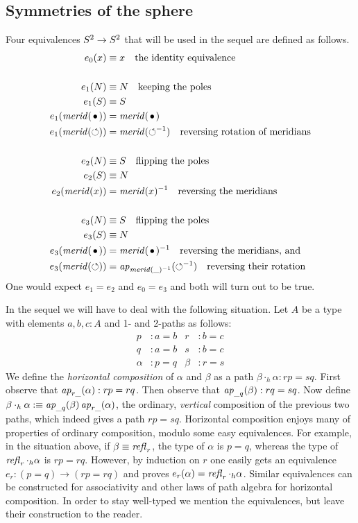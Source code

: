 \documentclass[english,a4]{article}
\begin{document}
\subsection{Symmetries of the sphere}
\label{sec:symmetries-sphere}

Four equivalences $S^2\to S^2$ that will be used in the sequel are
defined as follows. 
\begin{align}
  \label{eq:S2symmetries}
  e_0(x)&\jdeq x \quad\text{the identity equivalence}\\
\nonumber\\
  e_1(N)&\jdeq N \quad\text{keeping the poles}\\
  e_1(S)&\jdeq S\\
  e_1(\mrd(\base))&= \mrd(\base)\\
  e_1(\mrd(\Sloop))&= \mrd(\Sloop^{-1})\quad\text{reversing rotation of meridians}\\
\nonumber\\
  e_2(N)&\jdeq S \quad\text{flipping the poles}\\
  e_2(S)&\jdeq N\\
  e_2(\mrd(x))&= \mrd(x)^{-1}\quad\text{reversing the meridians}\\
\nonumber\\
  e_3(N)&\jdeq S \quad\text{flipping the poles}\\
  e_3(S)&\jdeq N\\
  e_3(\mrd(\base))&= \mrd(\base)^{-1}\quad\text{reversing the meridians, and}\\
  e_3(\mrd(\Sloop))&= \ap{\mrd(\_)^{-1}}(\Sloop^{-1})\quad\text{reversing their rotation}
\end{align}
One would expect $e_1=e_2$ and $e_0=e_3$ and both will turn out to be true.

In the sequel we will have to deal with the following situation.
Let $A$ be a type with elements $a, b, c : A$ and 1- and 2-paths as follows:
%
\begin{align*}
  p &: a = b       &       r &: b = c \\
  q &: a = b       &       s &: b = c \\
  \alpha &: p = q  &   \beta &: r = s
\end{align*}
%
We define the \emph{horizontal composition} of $\alpha$ and $\beta$ as 
a path $\beta\cdot_h\alpha: rp=sq$.
First observe that $\mathop{{\it ap}_{r\_}}(\alpha):rp=rq$.
Then observe that $\mathop{{\it ap}_{\_q}}(\beta):rq=sq$.
Now define $\beta\cdot_h\alpha \mathrel{\hbox{:}\mkern-5mu\equiv} \mathop{{\it ap}_{\_q}}(\beta)\mathop{{\it ap}_{r\_}}(\alpha)$,
the ordinary, \emph{vertical} composition of the previous two paths,
which indeed gives a path $rp=sq$. Horizontal composition enjoys many of
properties of ordinary composition, modulo some easy equivalences.
For example, in the situation above, if $\beta\equiv\mathop{{\mathit{refl}}_{r}}$,
the type of $\alpha$ is $p=q$, whereas the type of $\mathop{{\mathit{refl}}_{r}}\cdot_h\alpha$
is $rp=rq$. However, by induction on $r$ one easily gets an equivalence
$e_r : (p=q) \to (rp=rq)$ and proves $e_r(\alpha)=\mathop{{\mathit{refl}}_{r}}\cdot_h\alpha$.
Similar equivalences can be constructed for associativity and other laws
of path algebra for horizontal composition. In order to stay well-typed
we mention the equivalences, but leave their construction to the reader.
\end{document}
